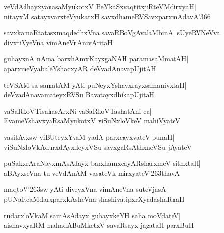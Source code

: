 \documentclass[twoside,12pt,openright]{book}
\def\S{\char'263}
\newcounter{shloka}[chapter]
\begin{document}
\begin{shloka}%
veVdAdhayxyanasaMyukotxV BeYkaSxvaqtitxjiRteVMdirxyaH|\\
nitayxM satayxvarxteVyukatxH savxdhameRVSavxparxmAdavA\char'366
\end{shloka}

\begin{shloka}%
savxkamaRtatasxmaqdedhxVna savaRBoVgAvalaMbinA|
sUyeRVNeVva divxtiVyeVna vimAneVnAnivAritaH
\end{shloka}

\begin{shloka}%
guhayxnA nAma barxhAmxKayxgaNAH paramasaMmatAH|\\
aparxmeVyabaleYshacxyAR deVvadAnavapUjitAH
\end{shloka}

\begin{shloka}%
teVSAM sa samatAM yAti puNeyxYshavxrayxsamanivxtaH|\\
deVvadAnavamateyxRVSu BavatayxdhikapUjitaH
\end{shloka}

\begin{shloka}%
vaSaRkoVTisahasArxNi vaSaRkoVTashatAni ca|\\
EvameYshavxyaRsaMyukotxV viSuNxloVkeV mahiVyateV
\end{shloka}

\begin{shloka}%
vasitAvxsw viBUteyxYvaM yadA parxcayxvateV punaH|\\
viSuNxloVkAdurxdAyxdeyxVSu savxgaRsAthxneVSu jAyateV
\end{shloka}

\begin{shloka}%
puSakxrAraNayxmAsAdayx barxhamxcayARsharxmeV sithxtaH|\\
aBAyxseVna tu veVdAnAM vasateVk mirxyateV\S thavA
\end{shloka}

\begin{shloka}%
maqtoV\S sw yAti diveyxVna vimAneVna suteVjasA|\\
pUNaRcaMdarxparxkAsheVna shashivatipxrXyadashaRnaH
\end{shloka}

\begin{shloka}%
rudarxloVkaM samAsAdayx guhayxkeYH saha moVdateV|\\
aishavxyaRM mahadABuMketxV savaRsayx jagataH parxBuH
\end{shloka}
\end{document}
